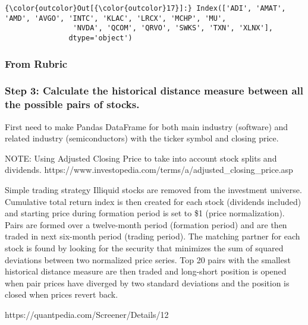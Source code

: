 \documentclass[11pt]{article}
\begin{document}
\begin{Verbatim}[commandchars=\\\{\}]
{\color{outcolor}Out[{\color{outcolor}17}]:} Index(['ADI', 'AMAT', 'AMD', 'AVGO', 'INTC', 'KLAC', 'LRCX', 'MCHP', 'MU',
                'NVDA', 'QCOM', 'QRVO', 'SWKS', 'TXN', 'XLNX'],
               dtype='object')
\end{Verbatim}
            
    \subsubsection{From Rubric}\label{from-rubric}

\subsubsection{Step 3: Calculate the historical distance measure between
all the possible pairs of
stocks.}\label{step-3-calculate-the-historical-distance-measure-between-all-the-possible-pairs-of-stocks.}

    First need to make Pandas DataFrame for both main industry (software)
and related industry (semiconductors) with the ticker symbol and closing
price.

NOTE: Using Adjusted Closing Price to take into account stock splits and
dividends.
https://www.investopedia.com/terms/a/adjusted\_closing\_price.asp

Simple trading strategy Illiquid stocks are removed from the investment
universe. Cumulative total return index is then created for each stock
(dividends included) and starting price during formation period is set
to \$1 (price normalization). Pairs are formed over a twelve-month
period (formation period) and are then traded in next six-month period
(trading period). The matching partner for each stock is found by
looking for the security that minimizes the sum of squared deviations
between two normalized price series. Top 20 pairs with the smallest
historical distance measure are then traded and long-short position is
opened when pair prices have diverged by two standard deviations and the
position is closed when prices revert back.

https://quantpedia.com/Screener/Details/12
\end{document}
